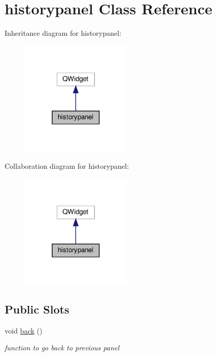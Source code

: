 \hypertarget{classhistorypanel}{}\section{historypanel Class Reference}
\label{classhistorypanel}


Inheritance diagram for historypanel\+:\nopagebreak
\begin{figure}[H]
\begin{center}
\leavevmode
\includegraphics[width=149pt]{classhistorypanel__inherit__graph}
\end{center}
\end{figure}


Collaboration diagram for historypanel\+:\nopagebreak
\begin{figure}[H]
\begin{center}
\leavevmode
\includegraphics[width=149pt]{classhistorypanel__coll__graph}
\end{center}
\end{figure}
\subsection*{Public Slots}
\begin{DoxyCompactItemize}
\item 
\mbox{\label{classhistorypanel_a93f8f39455d2465e5f4cb95d9e82cb65}} 
void \hyperlink{classhistorypanel_a93f8f39455d2465e5f4cb95d9e82cb65}{back} ()
\begin{DoxyCompactList}\small\item\em function to go back to previous panel \end{DoxyCompactList}\end{DoxyCompactItemize}
